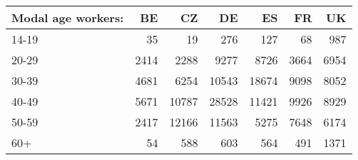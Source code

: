 \begin{tabular}{lrrrrrr}
\toprule
Modal age workers: & BE   & CZ    & DE    & ES    & FR   & UK   \\
\midrule
14-19              & 35   & 19    & 276   & 127   & 68   & 987  \\
20-29              & 2414 & 2288  & 9277  & 8726  & 3664 & 6954 \\
30-39              & 4681 & 6254  & 10543 & 18674 & 9098 & 8052 \\
40-49              & 5671 & 10787 & 28528 & 11421 & 9926 & 8929 \\
50-59              & 2417 & 12166 & 11563 & 5275  & 7648 & 6174 \\
60+                & 54   & 588   & 603   & 564   & 491  & 1371 \\
\bottomrule
\end{tabular}
